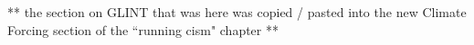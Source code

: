 \newpage

** the section on GLINT that was here was copied / pasted into the new Climate Forcing section of the ``running cism" chapter **

%
